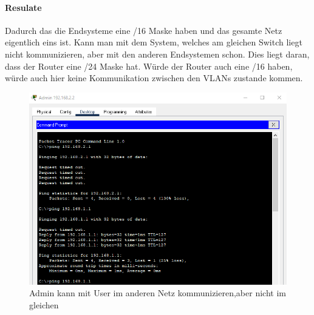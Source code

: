 \paragraph{Resulate}
Dadurch das die Endsysteme eine /16 Maske haben und das gesamte Netz eigentlich eins ist. Kann man mit dem System, welches am gleichen Switch liegt nicht kommunizieren, aber mit den anderen Endsystemen schon. Dies liegt daran, dass der Router eine /24 Maske hat. Würde der Router auch eine /16 haben, würde auch hier keine Kommunikation zwischen den VLANs zustande kommen.
\begin{figure}[!htb]
    \centering
    \includegraphics[width=\textwidth,height=.7\textwidth,keepaspectratio]{./img/test1/resultat.png}
    \caption{Admin kann mit User im anderen Netz kommunizieren,aber nicht im gleichen}
\end{figure}
\FloatBarrier

